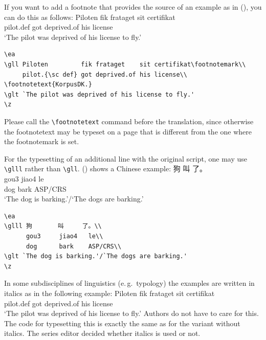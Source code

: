 If you want to add a footnote that provides the source of an example as in (), you can do
this as follows:
\ea
\gll Piloten         fik frataget    sit certifikat\footnotemark\\
     pilot.{\sc def} got deprived.of his license\\
\glt `The pilot was deprived of his license to fly.'
\z 
\begin{verbatim}
\ea
\gll Piloten         fik frataget    sit certifikat\footnotemark\\
     pilot.{\sc def} got deprived.of his license\\
\footnotetext{KorpusDK.}
\glt `The pilot was deprived of his license to fly.'
\z 
\end{verbatim}
Please call the \verb+\footnotetext+ command before the translation, since otherwise the
footnotetext may be typeset on a page that is different from the one where the footnotemark is set.

For the typesetting of an additional line with the original script, one may use \verb+\glll+ rather
than \verb+\gll+. () shows a Chinese example:
\ea
\label{ex-chinese}
\glll 狗       叫     了。\\
      gou3     jiao4   le\\
      dog      bark    ASP/CRS\\
\glt `The dog is barking.'/`The dogs are barking.'
\z

\begin{verbatim}
\ea
\glll 狗       叫     了。\\
      gou3     jiao4   le\\
      dog      bark    ASP/CRS\\
\glt `The dog is barking.'/`The dogs are barking.'
\z
\end{verbatim}


In some subdisciplines of linguistics (e.\,g.\ typology) the examples are written in italics as in the
following example:
\ea
\def\exfont{\normalsize\it}
\gll Piloten         fik frataget    sit certifikat\footnotemark\\
     pilot.{\sc def} got deprived.of his license\\
\glt `The pilot was deprived of his license to fly.'
\z 
Authors do not have to care for this. The code for typesetting this is exactly the same as for the
variant without italics.
The series editor decided whether italics is used or not.

